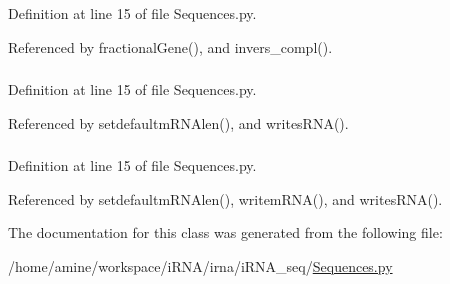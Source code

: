 \-Definition at line 15 of file \-Sequences.\-py.



\-Referenced by fractional\-Gene(), and invers\-\_\-compl().

\hypertarget{classirna_1_1iRNA__seq_1_1Sequences_1_1Sequences_a98bf038d1355cf769421d59fd5d33dc2}{
\subsubsection[{list\-\_\-genes}]{}}
\label{classirna_1_1iRNA__seq_1_1Sequences_1_1Sequences_a98bf038d1355cf769421d59fd5d33dc2}


\-Definition at line 15 of file \-Sequences.\-py.



\-Referenced by setdefaultm\-R\-N\-Alen(), and writes\-R\-N\-A().

\hypertarget{classirna_1_1iRNA__seq_1_1Sequences_1_1Sequences_a078ccc0283cf8832c2b6162c0e31ccc7}{
\subsubsection[{organism}]{}}
\label{classirna_1_1iRNA__seq_1_1Sequences_1_1Sequences_a078ccc0283cf8832c2b6162c0e31ccc7}


\-Definition at line 15 of file \-Sequences.\-py.



\-Referenced by setdefaultm\-R\-N\-Alen(), writem\-R\-N\-A(), and writes\-R\-N\-A().



\-The documentation for this class was generated from the following file\-:\begin{DoxyCompactItemize}
\item 
/home/amine/workspace/i\-R\-N\-A/irna/i\-R\-N\-A\-\_\-seq/\hyperlink{Sequences_8py}{\-Sequences.\-py}\end{DoxyCompactItemize}
